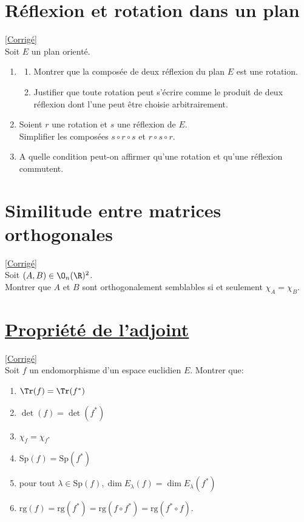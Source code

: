 \documentclass[8pt]{book}
\begin{document}
\section{Réflexion et rotation dans un plan }
\label{Réflexion et rotation dans un plan}
\textcolor{blue}{\hyperref[Réflexion et rotation dans un plan corrigé]{[Corrigé]}}\\
Soit $E$ un plan orienté.
\begin{enumerate}
	\item \begin{enumerate}[label=\alph*.]
		\item Montrer que la composée de deux réflexion du plan $E$ est une rotation.
		\item Justifier que toute rotation peut s'écrire comme le produit de deux réflexion dont l'une peut être choisie arbitrairement.
	\end{enumerate}
	\item Soient $r$ une rotation et $s$ une réflexion de $E$.
	\\ Simplifier les composées $s\circ r\circ s$ et $r\circ s\circ r$.
	\item A quelle condition peut-on affirmer qu'une rotation et qu'une réflexion commutent.
\end{enumerate}

\section{Similitude entre matrices orthogonales }
\label{Similitude entre matrices orthogonales}
\textcolor{blue}{\hyperref[Similitude entre matrices orthogonales corrigé]{[Corrigé]}}\\
Soit $(A,B)\in \O_n(\R)^2$.\\
Montrer que $A$ et $B$ sont orthogonalement semblables si et seulement $\chi_A=\chi_B$.

\section{\underline{Propriété de l'adjoint} }
\label{Propriété de l'adjoint}
\textcolor{blue}{\hyperref[Propriété de l'adjoint corrigé]{[Corrigé]}}\\
Soit $f$ un endomorphisme d'un espace euclidien $E$.
Montrer que:
\begin{enumerate}
	\item $\Tr(f)=\Tr(f^*)$
	\item $\det(f)=\det(f^*)$
	\item $\chi_f=\chi_{f^*}$
	\item $\text{Sp}(f)=\text{Sp}(f^*)$
	\item pour tout $\lambda\in\text{Sp}(f),\dim E_{\lambda}(f)=\dim E_{\lambda}(f^*)$
	\item $\text{rg}(f)=\text{rg}(f^*)=\text{rg}(f\circ f^*)=\text{rg}(f^*\circ f)$.
\end{enumerate}
\end{document}
